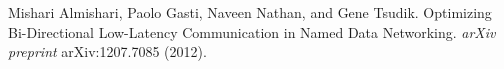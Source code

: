\documentclass[10pt]{article}
\begin{document}
\begin{thebibliography}{[MT1]}
 Mishari Almishari, Paolo Gasti, Naveen Nathan, and Gene Tsudik. Optimizing Bi-Directional Low-Latency Communication in Named Data Networking. \emph{arXiv preprint} arXiv:1207.7085 (2012).


\end{thebibliography}
\end{document}
